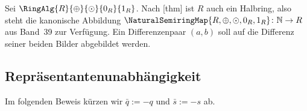 \documentclass[main.tex]{subfiles}
\begin{document}
Sei \(\RingAlg{R}{\oplus}{\odot}{0_R}{1_R}\). Nach
[thm] ist \(R\) auch ein Halbring,
also steht die kanonische Abbildung
\(\NaturalSemiringMap{R,\oplus,\odot,0_R,1_R}\colon\mathbb N\to R\)
aus Band~39 zur Verfügung. Ein Differenzenpaar \((a,b)\) soll auf die
Differenz seiner beiden Bilder abgebildet werden.

\subsection{Repräsentantenunabhängigkeit}

Im folgenden Beweis kürzen wir
\(\bar q:=-q\) und \(\bar s:=-s\) ab.
\end{document}

